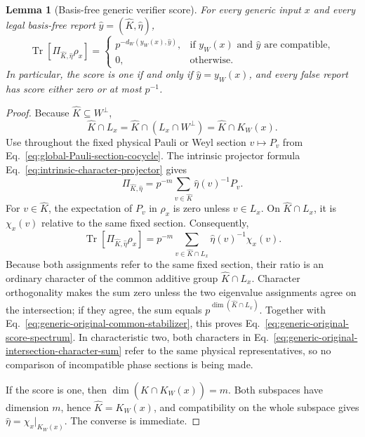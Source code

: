\documentclass[11pt]{article}
\newcommand{\Tr}{\operatorname{Tr}}
\newcommand{\1}{\mathbf 1}
\theoremstyle{plain}
\newtheorem{lemma}[theorem]{Lemma}
\theoremstyle{definition}
\theoremstyle{remark}
\begin{document}
\begin{lemma}[Basis-free generic verifier score]
\label{lem:generic-original-score-spectrum}
For every generic input $x$ and every legal basis-free report
$\widehat y=(\widehat K,\widehat\eta)$,
\begin{equation}
 \Tr[\Pi_{\widehat K,\widehat\eta}\rho_x]
 =\begin{cases}
 p^{-d_W(y_W(x),\widehat y)},
 &\text{if $y_W(x)$ and $\widehat y$ are compatible},\\
 0,&\text{otherwise}.
 \end{cases}
 \label{eq:generic-original-score-spectrum}
\end{equation}
In particular, the score is one if and only if
$\widehat y=y_W(x)$, and every false report has score either zero or at most
$p^{-1}$.
\end{lemma}
\begin{proof}
Because $\widehat K\subseteq W^\perp$,
\begin{equation}
 \widehat K\cap L_x
 =\widehat K\cap(L_x\cap W^\perp)
 =\widehat K\cap K_W(x).
 \label{eq:generic-original-common-stabilizer}
\end{equation}
Use throughout the fixed physical Pauli or Weyl section $v\mapsto P_v$ from
Eq.~\eqref{eq:global-Pauli-section-cocycle}.  The intrinsic projector formula
Eq.~\eqref{eq:intrinsic-character-projector} gives
\begin{equation}
 \Pi_{\widehat K,\widehat\eta}
 =p^{-m}\sum_{v\in\widehat K}
 \widehat\eta(v)^{-1}P_v.
 \label{eq:generic-original-projector-expansion}
\end{equation}
For $v\in\widehat K$, the expectation of $P_v$ in $\rho_x$ is zero unless
$v\in L_x$.  On $\widehat K\cap L_x$, it is $\chi_x(v)$ relative to the same
fixed section.  Consequently,
\begin{equation}
 \Tr[\Pi_{\widehat K,\widehat\eta}\rho_x]
 =p^{-m}\sum_{v\in\widehat K\cap L_x}
 \widehat\eta(v)^{-1}\chi_x(v).
 \label{eq:generic-original-intersection-character-sum}
\end{equation}
Because both assignments refer to the same fixed section, their ratio is an
ordinary character of the common additive group $\widehat K\cap L_x$.  Character
orthogonality makes the sum zero unless the two eigenvalue assignments agree
on the intersection; if they agree, the sum equals
$p^{\dim(\widehat K\cap L_x)}$.  Together with
Eq.~\eqref{eq:generic-original-common-stabilizer}, this proves
Eq.~\eqref{eq:generic-original-score-spectrum}.  In characteristic two, both
characters in Eq.~\eqref{eq:generic-original-intersection-character-sum} refer
to the same physical representatives, so no comparison of incompatible phase
sections is being made.

If the score is one, then
$\dim(\widehat K\cap K_W(x))=m$.  Both subspaces have dimension $m$, hence
$\widehat K=K_W(x)$, and compatibility on the whole subspace gives
$\widehat\eta=\chi_x|_{K_W(x)}$.  The converse is immediate.
\end{proof}
\end{document}
